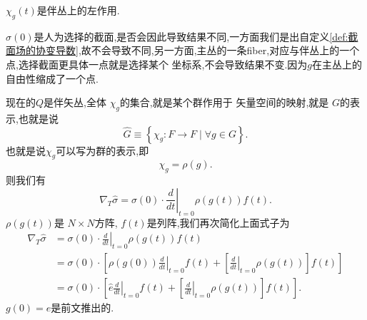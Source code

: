 \documentclass[../main.tex]{subfiles}
\begin{document}
$\chi_g(t)$是伴丛上的左作用.
 \begin{note}
   $\sigma(0)$是人为选择的截面,是否会因此导致结果不同,一方面我们是出自定义\ref{def:截面场的协变导数},故不会导致不同,另一方面,主丛的一条fiber,对应与伴丛上的一个点,选择截面更具体一点就是选择某个
   坐标系,不会导致结果不变.因为$g$在主丛上的自由性缩成了一个点.
\end{note}
现在的$Q$是伴矢丛,全体 $\chi_g$的集合,就是某个群作用于 矢量空间的映射,就是 $G$的表示,也就是说 \[
  \hat{G} \equiv \left\{ \chi_g: F\to F  \mid \forall g \in G \right\} 
.\] 
也就是说$\chi_g$可以写为群的表示,即\[
\chi_g = \rho(g)
.\] 
则我们有\[
\nabla_T \hat{\sigma} = \sigma(0) \cdot  \left.\frac{d}{dt}\right|_{t = 0} \rho(g(t)) f(t)
.\] 
$\rho(g(t))$是 $N \times N$方阵, $f(t)$是列阵,我们再次简化上面式子为
 \begin{align*}
   \nabla_T \hat{\sigma} &= \sigma(0) \cdot  \left.\frac{d}{dt}\right|_{t = 0} \rho(g(t)) f(t)\\
             & = \sigma(0) \cdot \left[ \rho(g(0))\left.\frac{d}{dt}\right|_{t = 0} f(t) + \left[ \left.\frac{d}{dt}\right|_{t = 0} \rho(g(t)) \right]f(t)   \right]  \\
             & = \sigma(0) \cdot \left[ \hat{e}\left.\frac{d}{dt}\right|_{t = 0} f(t) + \left[ \left.\frac{d}{dt}\right|_{t = 0} \rho(g(t)) \right]f(t)   \right]  
.\end{align*}
$g(0) = e$是前文推出的.
\end{document}
